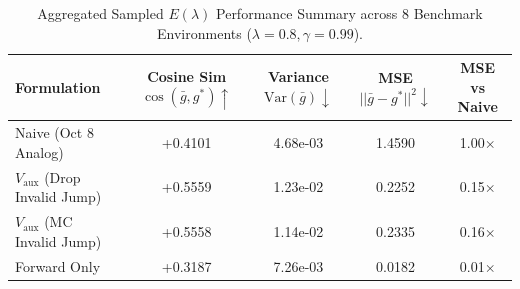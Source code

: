 \documentclass{article}
\theoremstyle{plain}
\theoremstyle{definition}
\theoremstyle{remark}
\begin{document}
\begin{table}[t]
\centering
\caption{Aggregated Sampled $E(\lambda)$ Performance Summary across 8 Benchmark Environments ($\lambda=0.8, \gamma=0.99$).} \label{tab:E_lambda_sampling_aggregate}
\vspace{4pt}
\begin{tabular}{lcccc}
\toprule
\textbf{Formulation} & \textbf{Cosine Sim} $\cos(\bar{g}, g^*) \uparrow$ & \textbf{Variance} $\mathrm{Var}(\bar{g}) \downarrow$ & \textbf{MSE} $||\bar{g} - g^*||^2 \downarrow$ & \textbf{MSE vs Naive} \\
\midrule
Naive (Oct 8 Analog) & +0.4101 & 4.68e-03 & 1.4590 & 1.00$\times$ \\
$V_{\mathrm{aux}}$ (Drop Invalid Jump) & +0.5559 & 1.23e-02 & 0.2252 & 0.15$\times$ \\
$V_{\mathrm{aux}}$ (MC Invalid Jump) & +0.5558 & 1.14e-02 & 0.2335 & 0.16$\times$ \\
Forward Only & +0.3187 & 7.26e-03 & 0.0182 & 0.01$\times$ \\
\bottomrule
\end{tabular}
\end{table}
\end{document}
